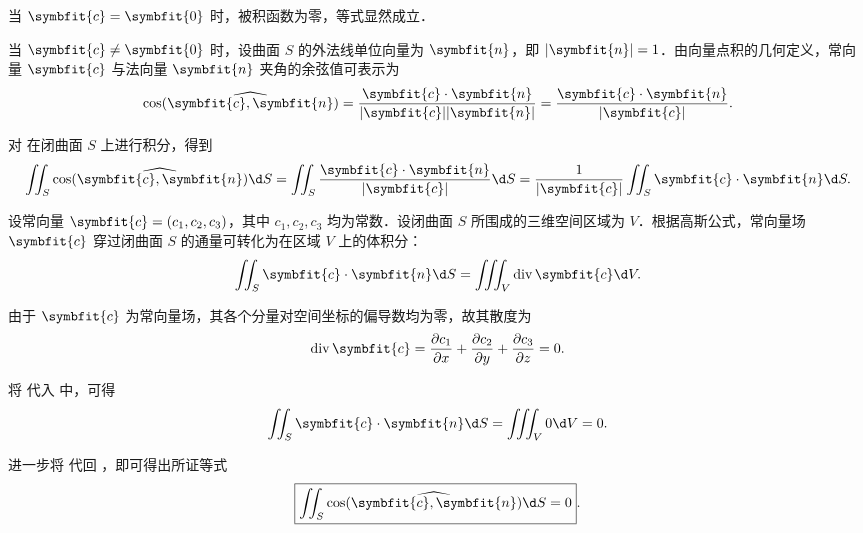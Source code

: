\begin{myproof}
    当 $\symbfit{c} = \symbfit{0}$ 时，被积函数为零，等式显然成立．

    当 $\symbfit{c} \neq \symbfit{0}$ 时，设曲面 $S$ 的外法线单位向量为 $\symbfit{n}$，即 $|\symbfit{n}| = 1$．由向量点积的几何定义，常向量 $\symbfit{c}$ 与法向量 $\symbfit{n}$ 夹角的余弦值可表示为
    \begin{equation}
        \label{eq:cos-def}
        \cos(\widehat{\symbfit{c}, \symbfit{n}}) = \frac{\symbfit{c} \cdot \symbfit{n}}{|\symbfit{c}| |\symbfit{n}|} = \frac{\symbfit{c} \cdot \symbfit{n}}{|\symbfit{c}|}.
    \end{equation}

    对  在闭曲面 $S$ 上进行积分，得到
    \begin{equation}
        \label{eq:integral-transform}
        \iint_S \cos(\widehat{\symbfit{c}, \symbfit{n}}) \d S = \iint_S \frac{\symbfit{c} \cdot \symbfit{n}}{|\symbfit{c}|} \d S = \frac{1}{|\symbfit{c}|} \iint_S \symbfit{c} \cdot \symbfit{n} \d S.
    \end{equation}

    设常向量 $\symbfit{c} = (c_1, c_2, c_3)$，其中 $c_1, c_2, c_3$ 均为常数．设闭曲面 $S$ 所围成的三维空间区域为 $V$．根据高斯公式，常向量场 $\symbfit{c}$ 穿过闭曲面 $S$ 的通量可转化为在区域 $V$ 上的体积分：
    \begin{equation}
        \label{eq:gauss-formula}
        \iint_S \symbfit{c} \cdot \symbfit{n} \d S = \iiint_V \operatorname{div} \symbfit{c} \d V.
    \end{equation}

    由于 $\symbfit{c}$ 为常向量场，其各个分量对空间坐标的偏导数均为零，故其散度为
    \begin{equation}
        \label{eq:divergence}
        \operatorname{div} \symbfit{c} = \frac{\partial c_1}{\partial x} + \frac{\partial c_2}{\partial y} + \frac{\partial c_3}{\partial z} = 0.
    \end{equation}

    将  代入  中，可得
    \begin{equation}
        \label{eq:flux-zero}
        \iint_S \symbfit{c} \cdot \symbfit{n} \d S = \iiint_V 0 \d V = 0.
    \end{equation}

    进一步将  代回 ，即可得出所证等式
    \begin{equation}
        \label{eq:final-proof-1}
        \boxed{\iint_S \cos(\widehat{\symbfit{c}, \symbfit{n}}) \d S = 0}.
    \end{equation}
\end{myproof}

